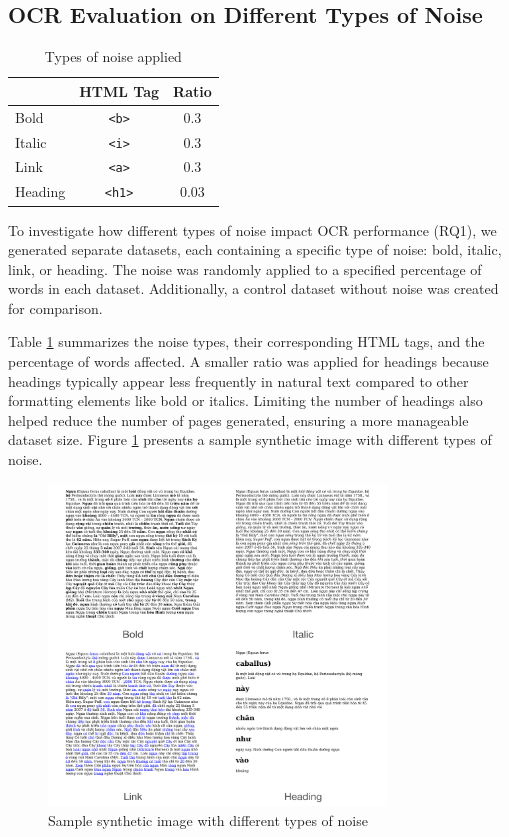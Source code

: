 \documentclass[12pt,oneside]{memoir}
\begin{document}
\subsection{OCR Evaluation on Different Types of Noise}

\begin{table}[ht]
    \centering
    \caption{Types of noise applied}
    \label{table:noises}
    \begin{tabular}{lcc}
        \toprule
        & HTML Tag & Ratio\\
        \midrule
        Bold & \texttt{<b>} & 0.3\\
        Italic & \texttt{<i>} & 0.3\\
        Link & \texttt{<a>} & 0.3\\
        Heading & \texttt{<h1>} & 0.03\\
        \bottomrule
    \end{tabular}
\end{table}

To investigate how different types of noise impact OCR performance (RQ1), we generated separate datasets, each containing a specific type of noise: bold, italic, link, or heading. 
The noise was randomly applied to a specified percentage of words in each dataset. 
Additionally, a control dataset without noise was created for comparison.

Table \ref{table:noises} summarizes the noise types, their corresponding HTML tags, and the percentage of words affected.
A smaller ratio was applied for headings because headings typically appear less frequently in natural text compared to other formatting elements like bold or italics.
Limiting the number of headings also helped reduce the number of pages generated, ensuring a more manageable dataset size.
Figure \ref{figure:noises} presents a sample synthetic image with different types of noise.

\begin{figure}[ht]
    \centering
    \includegraphics[width=0.8\textwidth]{images/noises.png}
    \caption{Sample synthetic image with different types of noise}
    \label{figure:noises}
\end{figure}
\end{document}
